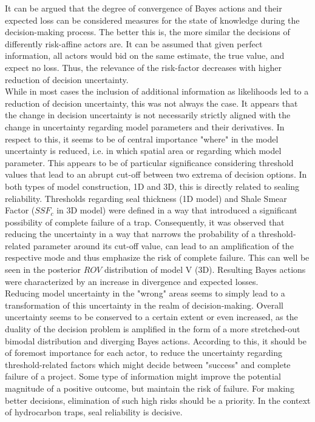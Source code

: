 	It can be argued that the degree of convergence of Bayes actions and their expected loss can be considered measures for the state of knowledge during the decision-making process. The better this is, the more similar the decisions of differently risk-affine actors are. It can be assumed that given perfect information, all actors would bid on the same estimate, the true value, and expect no loss. Thus, the relevance of the risk-factor decreases with higher reduction of decision uncertainty.\\			
	While in most cases the inclusion of additional information as likelihoods led to a reduction of decision uncertainty, this was not always the case. It appears that the change in decision uncertainty is not necessarily strictly aligned with the change in uncertainty regarding model parameters and their derivatives. In respect to this, it seems to be of central importance "where" in the model uncertainty is reduced, i.e. in which spatial area or regarding which model parameter. This appears to be of particular significance considering threshold values that lead to an abrupt cut-off between two extrema of decision options. In both types of model construction, 1D and 3D, this is directly related to sealing reliability. Thresholds regarding seal thickness (1D model) and Shale Smear Factor ($SSF_c$ in 3D model) were defined in a way that introduced a significant possibility of complete failure of a trap. Consequently, it was observed that reducing the uncertainty in a way that narrows the probability of a threshold-related parameter around its cut-off value, can lead to an amplification of the respective mode and thus emphasize the risk of complete failure. This can well be seen in the posterior $ROV$ distribution of model V (3D). Resulting Bayes actions were characterized by an increase in divergence and expected losses.\\
	Reducing model uncertainty in the "wrong" areas seems to simply lead to a transformation of this uncertainty in the realm of decision-making. Overall uncertainty seems to be conserved to a certain extent or even increased, as the duality of the decision problem is amplified in the form of a more stretched-out bimodal distribution and diverging Bayes actions. According to this, it should be of foremost importance for each actor, to reduce the uncertainty regarding threshold-related factors which might decide between "success" and complete failure of a project. Some type of information might improve the potential magnitude of a positive outcome, but maintain the risk of failure. For making better decisions, elimination of such high risks should be a priority. In the context of hydrocarbon traps, seal reliability is decisive.\\
